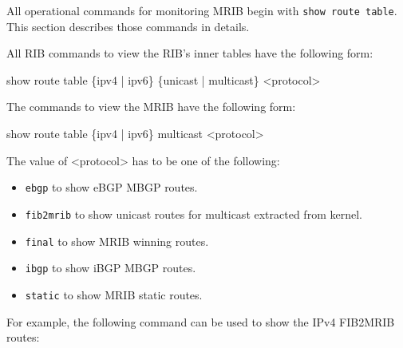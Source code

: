 All operational commands for monitoring MRIB begin with
{\tt show route table}. This section describes those commands in details.

All RIB commands to view the RIB's inner tables have the following form:

{\stt show route table \{ipv4 | ipv6\} \{unicast | multicast\} <protocol>}

The commands to view the MRIB have the following form:

{\stt show route table \{ipv4 | ipv6\} multicast <protocol>}

The value of {\stt <protocol>} has to be one of the following:

\begin{itemize}

  \item {\tt ebgp} to show eBGP MBGP routes.

  \item {\tt fib2mrib} to show unicast routes for multicast extracted
  from kernel.

  \item {\tt final} to show MRIB winning routes.

  \item {\tt ibgp} to show iBGP MBGP routes.

  \item {\tt static} to show MRIB static routes.

\end{itemize}

For example, the following command can be used to show the IPv4 FIB2MRIB
routes:

